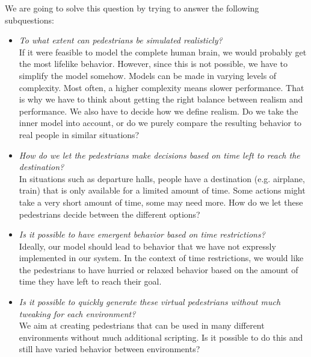 \documentclass[11pt]{book}
\begin{document}
We are going to solve this question by trying to answer the following subquestions:
\begin{itemize}
\item \emph{To what extent can pedestrians be simulated realisticly?}\\
If it were feasible to model the complete human brain, we would probably get the most lifelike behavior. However, since this is not possible, we have to simplify the model somehow. Models can be made in varying levels of complexity. Most often, a higher complexity means slower performance. That is why we have to think about getting the right balance between realism and performance. We also have to decide how we define realism. Do we take the inner model into account, or do we purely compare the resulting behavior to real people in similar situations?

\item \emph{How do we let the pedestrians make decisions based on time left to reach the destination?}\\
In situations such as departure halls, people have a destination (e.g. airplane, train) that is only available for a limited amount of time. Some actions might take a very short amount of time, some may need more. How do we let these pedestrians decide between the different options?

\item \emph{Is it possible to have emergent behavior based on time restrictions?}\\
Ideally, our model should lead to behavior that we have not expressly implemented in our system. In the context of time restrictions, we would like the pedestrians to have hurried or relaxed behavior based on the amount of time they have left to reach their goal.


\item \emph{Is it possible to quickly generate these virtual pedestrians without much tweaking for each environment?}
\\We aim at creating pedestrians that can be used in many different environments without much additional scripting. Is it possible to do this and still have varied behavior between environments?

\end{itemize}
\end{document}
